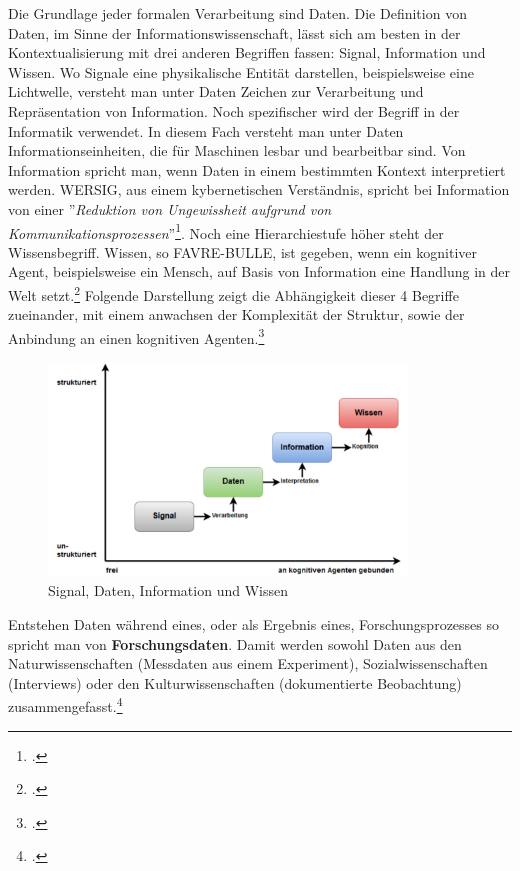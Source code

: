 \documentclass[12pt,a4paper]{article}
\begin{document}
Die Grundlage jeder formalen Verarbeitung sind Daten. Die Definition von Daten, im Sinne der Informationswissenschaft, lässt sich am besten in der Kontextualisierung mit drei anderen Begriffen fassen: Signal, Information und Wissen. Wo Signale eine physikalische Entität darstellen, beispielsweise eine Lichtwelle, versteht man unter Daten Zeichen zur Verarbeitung und Repräsentation von Information. Noch spezifischer wird der Begriff in der Informatik verwendet. In diesem Fach versteht man unter Daten Informationseinheiten, die für Maschinen lesbar und bearbeitbar sind. Von Information spricht man, wenn Daten in einem bestimmten Kontext interpretiert werden. WERSIG, aus einem kybernetischen Verständnis, spricht bei Information von einer ''\textit{Reduktion von Ungewissheit aufgrund von Kommunikationsprozessen}''\footcite[][S.74]{wersig1971information}. Noch eine Hierarchiestufe höher steht der Wissensbegriff. Wissen, so FAVRE-BULLE, ist gegeben, wenn ein kognitiver Agent, beispielsweise ein Mensch, auf Basis von Information eine Handlung in der Welt setzt.\footcite[][S.93-97]{favre2001information} Folgende Darstellung zeigt die Abhängigkeit dieser 4 Begriffe zueinander, mit einem anwachsen der Komplexität der Struktur, sowie der Anbindung an einen kognitiven Agenten.\footcite[Eine ausführlichere Auseinandersetzung mit den Begriffen Daten, Information und Wissen findet sich in meiner ersten Abschlussarbeit.][Masterarbeit Graz, S.20-28]{pollin2017suchen}
\begin{figure}[H]
\centering
	\includegraphics[width=0.85\textwidth]{img/daten.png}  
    \caption[Signal, Daten, Information und Wissen. POLLIN Christopher: Vom Suchen, Stöbern und Finden : Information Retrieval am Beispiel der Digitalen Sammlung des Hans Gross Kriminalmuseums, Masterarbeit Graz, S.21 ]{Signal, Daten, Information und Wissen} \label{fig:daten}
\end{figure} 
Entstehen Daten während eines, oder als Ergebnis eines, Forschungsprozesses so spricht man von \textbf{Forschungsdaten}. Damit werden sowohl Daten aus den Naturwissenschaften (Messdaten aus einem Experiment), Sozialwissenschaften (Interviews) oder den Kulturwissenschaften (dokumentierte Beobachtung) zusammengefasst.\footcite[][09.06.2019]{kindling2013forschungsdatenmanagement}
\end{document}
